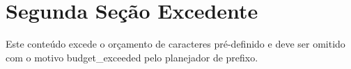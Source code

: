 \section{Segunda Seção Excedente}
Este conteúdo excede o orçamento de caracteres pré-definido e deve ser omitido com o motivo budget_exceeded pelo planejador de prefixo.
